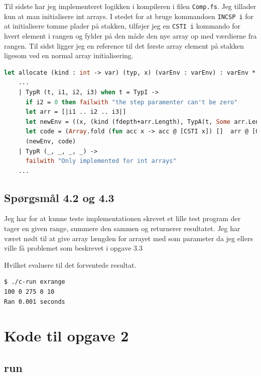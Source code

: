 \documentclass[danish,a4paper]{report}
\begin{document}
Til sidste har jeg implementeret logikken i kompileren i filen \texttt{Comp.fs}. Jeg tillader kun at man initialisere int arrays. I stedet for at bruge kommandoen \texttt{INCSP i} for at initialisere tomme plader på stakken, tilføjer jeg en \texttt{CSTI i} kommando for hvert element i rangen og fylder på den måde den nye array op med værdierne fra rangen. Til sidst ligger jeg en reference til det første array element på stakken ligesom ved en normal array initialisering.\newline

\begin{lstlisting}[language=ML]
let allocate (kind : int -> var) (typ, x) (varEnv : varEnv) : varEnv * instr list =
    ...
    | TypR (t, i1, i2, i3) when t = TypI ->
      if i2 = 0 then failwith "the step paramenter can't be zero"
      let arr = [|i1 .. i2 .. i3|]
      let newEnv = ((x, (kind (fdepth+arr.Length), TypA(t, Some arr.Length))) :: env, fdepth+arr.Length+1)
      let code = (Array.fold (fun acc x -> acc @ [CSTI x]) []  arr @ [GETSP; CSTI (arr.Length - 1); SUB])
      (newEnv, code) 
    | TypR (_, _, _, _) ->
      failwith "Only implemented for int arrays"
    ...
\end{lstlisting}

\section*{Spørgsmål 4.2 og 4.3}

Jeg har for at kunne teste implementationen skrevet et lille test program der tager en given range, summere den sammen og returnerer resultatet. Jeg har været nødt til at give array længden for arrayet med som parameter da jeg ellers ville få problemet som beskrevet i opgave 3.3



Hvilket evaluere til det forventede resultat.

\begin{lstlisting}[language=bash]
$ ./c-run exrange
100 0 275 0 10
Ran 0.001 seconds
\end{lstlisting}

\appendix
\chapter{Kode til opgave 2}
\section*{run}

\end{document}
